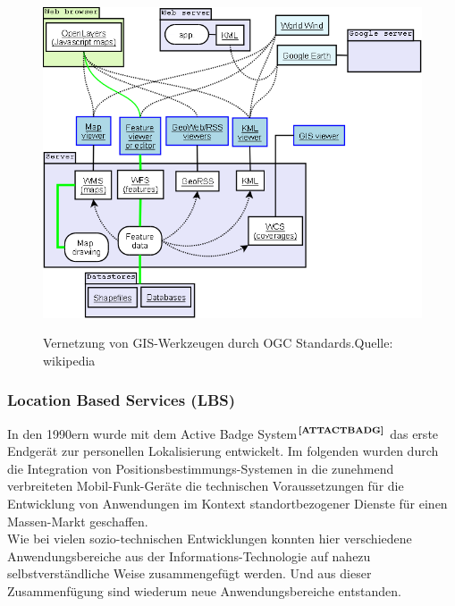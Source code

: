  \begin{figure}
      \centering
	  \includegraphics[scale=0.3]{bilder/Geoservices_server_with_apps.png}\\ \vspace{0.8cm}
  	  \caption{Vernetzung von GIS-Werkzeugen durch OGC Standards.\newline Quelle: wikipedia}
  \end{figure}

\subsubsection{Location Based Services (LBS)}
In den 1990ern wurde mit dem Active Badge System$^{\textbf{\ref{ATTACTBADG}}}$ das erste Endgerät zur personellen Lokalisierung entwickelt.
Im folgenden wurden durch die Integration von Positionsbestimmungs-Systemen in die zunehmend verbreiteten Mobil-Funk-Geräte die technischen Voraussetzungen für die Entwicklung von Anwendungen im Kontext standortbezogener Dienste für einen Massen-Markt geschaffen.\\
Wie bei vielen sozio-technischen Entwicklungen konnten hier verschiedene Anwendungsbereiche aus der Informations-Technologie auf nahezu selbstverständliche Weise zusammengefügt werden. Und aus dieser Zusammenfügung sind wiederum neue Anwendungsbereiche entstanden.

